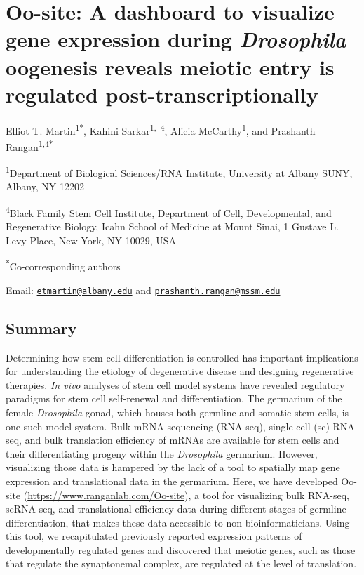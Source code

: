 \documentclass[12pt,oneside]{reedthesis}
\begin{document}
\hypertarget{oo-site-a-dashboard-to-visualize-gene-expression-during-drosophila-oogenesis-reveals-meiotic-entry-is-regulated-post-transcriptionally}{%
\chapter{\texorpdfstring{Oo-site: A dashboard to visualize gene expression during \emph{Drosophila} oogenesis reveals meiotic entry is regulated post-transcriptionally}{Oo-site: A dashboard to visualize gene expression during Drosophila oogenesis reveals meiotic entry is regulated post-transcriptionally}}\label{oo-site-a-dashboard-to-visualize-gene-expression-during-drosophila-oogenesis-reveals-meiotic-entry-is-regulated-post-transcriptionally}}

Elliot T. Martin\textsuperscript{1*}, Kahini Sarkar\textsuperscript{1,~4}, Alicia McCarthy\textsuperscript{1}, and
Prashanth Rangan\textsuperscript{1,4*}

\textsuperscript{1}Department of Biological Sciences/RNA Institute, University at Albany
SUNY, Albany, NY 12202

\textsuperscript{4}Black Family Stem Cell Institute, Department of Cell, Developmental,
and Regenerative Biology, Icahn School of Medicine at Mount Sinai, 1
Gustave L. Levy Place, New York, NY 10029, USA

\textsuperscript{*}Co-corresponding authors

Email: \href{mailto:etmartin@albany.edu}{\nolinkurl{etmartin@albany.edu}} and \href{mailto:prashanth.rangan@mssm.edu}{\nolinkurl{prashanth.rangan@mssm.edu}}


\hypertarget{summary-2}{%
\section{Summary}\label{summary-2}}

\setlength\parindent{24pt}

Determining how stem cell differentiation is controlled has important
implications for understanding the etiology of degenerative disease and
designing regenerative therapies. \emph{In vivo} analyses of stem cell model
systems have revealed regulatory paradigms for stem cell self-renewal
and differentiation. The germarium of the female \emph{Drosophila} gonad,
which houses both germline and somatic stem cells, is one such model
system. Bulk mRNA sequencing (RNA-seq), single-cell (sc) RNA-seq, and
bulk translation efficiency of mRNAs are available for stem cells and
their differentiating progeny within the \emph{Drosophila} germarium.
However, visualizing those data is hampered by the lack of a tool to
spatially map gene expression and translational data in the germarium.
Here, we have developed Oo-site (\url{https://www.ranganlab.com/Oo-site}), a
tool for visualizing bulk RNA-seq, scRNA-seq, and translational
efficiency data during different stages of germline differentiation,
that makes these data accessible to non-bioinformaticians. Using this
tool, we recapitulated previously reported expression patterns of
developmentally regulated genes and discovered that meiotic genes, such
as those that regulate the synaptonemal complex, are regulated at the
level of translation.
\end{document}
